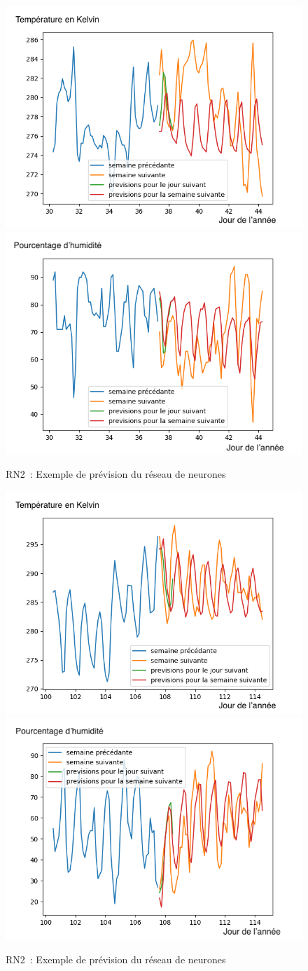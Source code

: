 \documentclass[11pt,a4paper]{article}
\begin{document}
\begin{figure} [H]
\centering
\includegraphics[width=0.48 \textwidth]{imagesTIPE/imagesIA/dessinTempIA30,25.png}\quad
\includegraphics[width=0.48 \textwidth]{imagesTIPE/imagesIA/dessinHumiIA30,25.png}
\caption{\label{fig:cosDS1} RN2~: Exemple de prévision du réseau de neurones}
\end{figure}
\begin{figure} [H]
\centering
\includegraphics[width=0.48 \textwidth]{imagesTIPE/imagesIA/dessinTempIA100,5.png}\quad
\includegraphics[width=0.48 \textwidth]{imagesTIPE/imagesIA/dessinHumiIA100,5.png}
\caption{\label{fig:cosDS2} RN2~: Exemple de prévision du réseau de neurones}
\end{figure}
\end{document}
